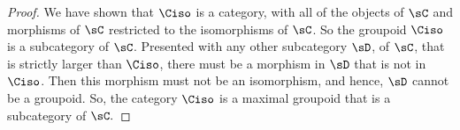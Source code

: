 \documentclass[main.tex]{subfiles}
\begin{document}
\begin{proof}
	We have shown that \(\Ciso\) is a category, with all of the objects of
	\(\sC\) and morphisms of \(\sC\) restricted to the isomorphisms of
	\(\sC\). So the groupoid \(\Ciso\) is a
	subcategory of \(\sC\). Presented with any other subcategory \(\sD\), of \(\sC\), that is
	strictly larger than \(\Ciso\), there must be a morphism in \(\sD\) that is
	not in \(\Ciso\). Then this morphism must not be an isomorphism, and
	hence, \(\sD\) cannot be a groupoid. So, the category \(\Ciso\) is a maximal
	groupoid that is a subcategory of \(\sC.\)
\end{proof}
\end{document}
